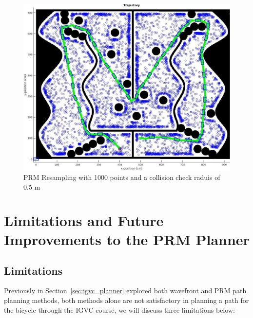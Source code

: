 \documentclass{article}
\begin{document}
\begin{figure}[H]
	\centering
	\includegraphics[width=\linewidth]{images/prm_resampling.jpg}
	\caption{PRM Resampling with 1000 points and a collision check raduis of 0.5 m}
	\label{fig:prm_resampling}
\end{figure}


\section{Limitations and Future Improvements to the PRM Planner}
\subsection{Limitations}

Previously in Section~\ref{sec:igvc_planner}  explored both wavefront and PRM path planning methods, both methods alone are not satisfactory in planning a path for the bicycle through the IGVC course, we will discuss three limitations below:
\end{document}
